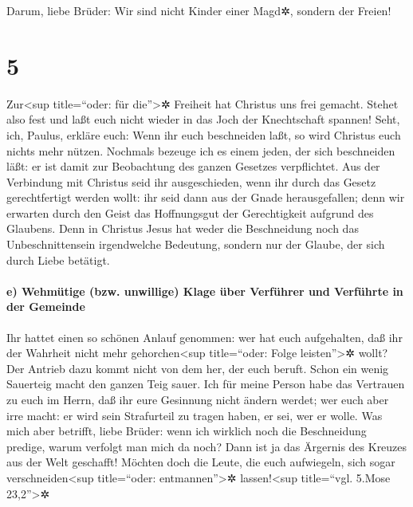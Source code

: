  Darum, liebe Brüder: Wir sind nicht Kinder einer Magd✲,
sondern der Freien!

\hypertarget{section-4}{%
\section{5}\label{section-4}}

 Zur\textless sup title=``oder: für die''\textgreater✲
Freiheit hat Christus uns frei gemacht. Stehet also fest und laßt euch
nicht wieder in das Joch der Knechtschaft spannen!  Seht,
ich, Paulus, erkläre euch: Wenn ihr euch beschneiden laßt, so wird
Christus euch nichts mehr nützen.  Nochmals bezeuge ich es
einem jeden, der sich beschneiden läßt: er ist damit zur Beobachtung des
ganzen Gesetzes verpflichtet.  Aus der Verbindung mit
Christus seid ihr ausgeschieden, wenn ihr durch das Gesetz
gerechtfertigt werden wollt: ihr seid dann aus der Gnade herausgefallen;
 denn wir erwarten durch den Geist das Hoffnungsgut der
Gerechtigkeit aufgrund des Glaubens.  Denn in Christus
Jesus hat weder die Beschneidung noch das Unbeschnittensein irgendwelche
Bedeutung, sondern nur der Glaube, der sich durch Liebe betätigt.

\hypertarget{e-wehmuxfctige-bzw.-unwillige-klage-uxfcber-verfuxfchrer-und-verfuxfchrte-in-der-gemeinde}{%
\paragraph{e) Wehmütige (bzw. unwillige) Klage über Verführer und
Verführte in der
Gemeinde}\label{e-wehmuxfctige-bzw.-unwillige-klage-uxfcber-verfuxfchrer-und-verfuxfchrte-in-der-gemeinde}}

 Ihr hattet einen so schönen Anlauf genommen: wer hat euch
aufgehalten, daß ihr der Wahrheit nicht mehr gehorchen\textless sup
title=``oder: Folge leisten''\textgreater✲ wollt?  Der
Antrieb dazu kommt nicht von dem her, der euch beruft. 
Schon ein wenig Sauerteig macht den ganzen Teig sauer. 
Ich für meine Person habe das Vertrauen zu euch im Herrn, daß ihr eure
Gesinnung nicht ändern werdet; wer euch aber irre macht: er wird sein
Strafurteil zu tragen haben, er sei, wer er wolle.  Was
mich aber betrifft, liebe Brüder: wenn ich wirklich noch die
Beschneidung predige, warum verfolgt man mich da noch? Dann ist ja das
Ärgernis des Kreuzes aus der Welt geschafft!  Möchten
doch die Leute, die euch aufwiegeln, sich sogar
verschneiden\textless sup title=``oder: entmannen''\textgreater✲
lassen!\textless sup title=``vgl. 5.Mose 23,2''\textgreater✲

